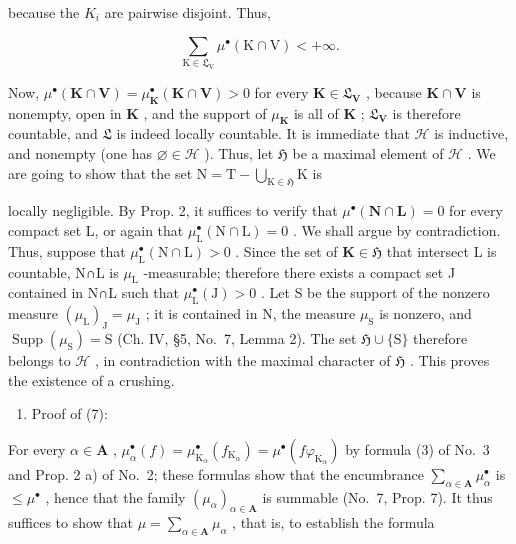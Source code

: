 because the \(K_{i}\) are pairwise disjoint. Thus,

\[
\sum_ {\mathrm{K} \in \mathfrak {L} _ {\mathrm{V}}} \mu^ {\bullet} (\mathrm{K} \cap \mathrm{V}) <   + \infty .
\]

Now, \(\mu^{\bullet}(\mathbf{K}\cap \mathbf{V}) = \mu_{\mathbf{K}}^{\bullet}(\mathbf{K}\cap \mathbf{V}) > 0\) for every \(\mathbf{K}\in \mathfrak{L}_{\mathbf{V}}\) , because \(\mathbf{K}\cap \mathbf{V}\) is nonempty, open in \(\mathbf{K}\) , and the support of \(\mu_{\mathbf{K}}\) is all of \(\mathbf{K}\) ; \(\mathfrak{L}_{\mathbf{V}}\) is therefore countable, and \(\mathfrak{L}\) is indeed locally countable. It is immediate that \(\mathcal{H}\) is inductive, and nonempty (one has \(\varnothing \in \mathcal{H}\) ). Thus, let \(\mathfrak{H}\) be a maximal element of \(\mathcal{H}\) . We are going to show that the set \(\mathrm{N} = \mathrm{T} - \bigcup_{\mathrm{K}\in \mathfrak{H}}\mathrm{K}\) is

locally negligible. By Prop. 2, it suffices to verify that \(\mu^{\bullet}(\mathbf{N}\cap\mathbf{L})=0\) for every compact set L, or again that \(\mu_{\mathrm{L}}^{\bullet}(\mathrm{N}\cap\mathrm{L})=0\) . We shall argue by contradiction. Thus, suppose that \(\mu_{\mathrm{L}}^{\bullet}(\mathrm{N}\cap\mathrm{L})>0\) . Since the set of \(\mathbf{K}\in\mathfrak{H}\) that intersect L is countable, N∩L is \(\mu_{\mathrm{L}}\) -measurable; therefore there exists a compact set J contained in N∩L such that \(\mu_{\mathrm{L}}^{\bullet}(\mathrm{J})>0\) . Let S be the support of the nonzero measure \((\mu_{\mathrm{L}})_{\mathrm{J}}=\mu_{\mathrm{J}}\) ; it is contained in N, the measure \(\mu_{\mathrm{S}}\) is nonzero, and \(\operatorname{Supp}(\mu_{\mathrm{S}})=\mathrm{S}\) (Ch. IV, §5, No.~7, Lemma 2). The set \(\mathfrak{H}\cup\{\mathrm{S}\}\) therefore belongs to \(\mathscr{H}\) , in contradiction with the maximal character of \(\mathfrak{H}\) . This proves the existence of a crushing.

\begin{enumerate}
\def\labelenumi{\Alph{enumi})}
\setcounter{enumi}{1}
\tightlist
\item
  Proof of (7):
\end{enumerate}

For every \(\alpha \in \mathbf{A}\) , \(\mu_{\alpha}^{\bullet}(f) = \mu_{\mathrm{K}_{\alpha}}^{\bullet}(f_{\mathrm{K}_{\alpha}}) = \mu^{\bullet}(f\varphi_{\mathrm{K}_{\alpha}})\) by formula (3) of No.~3 and Prop. 2 a) of No.~2; these formulas show that the encumbrance \(\sum_{\alpha \in \mathbf{A}} \mu_{\alpha}^{\bullet}\) is \(\leqslant \mu^{\bullet}\) , hence that the family \((\mu_{\alpha})_{\alpha \in \mathbf{A}}\) is summable (No.~7, Prop. 7). It thus suffices to show that \(\mu = \sum_{\alpha \in \mathbf{A}} \mu_{\alpha}\) , that is, to establish the formula

